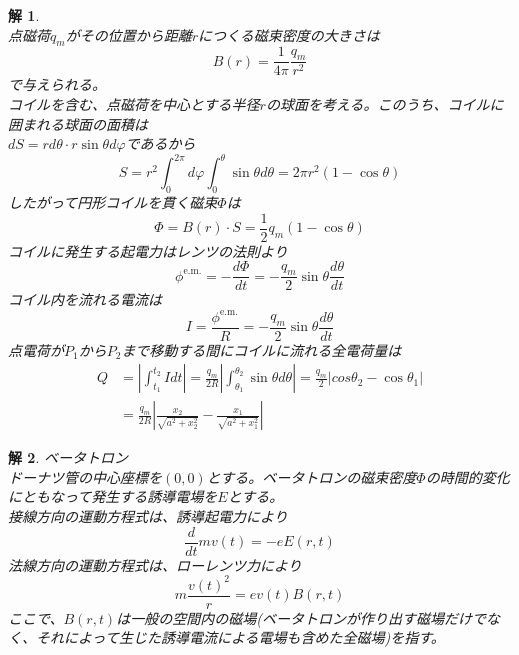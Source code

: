 \documentclass{jsarticle}
\newtheorem{ans}{解}[section]
\begin{document}
\begin{ans}~\\
    点磁荷\(q_{m}\)がその位置から距離\(r\)につくる磁束密度の大きさは
    \begin{equation*}
        B(r)=\frac{1}{4\pi}\frac{q_{m}}{r^2}
    \end{equation*}
    で与えられる。\\
    コイルを含む、点磁荷を中心とする半径\(r\)の球面を考える。このうち、コイルに囲まれる球面の面積は\\
    \(dS = rd\theta\cdot r\sin\theta d\varphi\)であるから
    \begin{equation*}
        S = r^{2}\int_{0}^{2\pi}d\varphi\int_{0}^{\theta}\sin\theta d\theta=2\pi r^{2}(1-\cos\theta)
    \end{equation*}
    したがって円形コイルを貫く磁束\(\Phi\)は
    \begin{equation*}
        \Phi = B(r)\cdot S=\frac{1}{2}q_{m}(1-\cos\theta)
    \end{equation*}
    コイルに発生する起電力はレンツの法則より
    \begin{equation*}
        \phi^{\mathrm{e.m.}}=-\frac{d\Phi}{dt}=-\frac{q_{m}}{2}\sin\theta\frac{d\theta}{dt}
    \end{equation*}
    コイル内を流れる電流は
    \begin{equation*}
        I = \frac{\phi^{\mathrm{e.m.}}}{R} = -\frac{q_{m}}{2}\sin\theta\frac{d\theta}{dt}
    \end{equation*}
    点電荷が\(P_{1}\)から\(P_{2}\)まで移動する間にコイルに流れる全電荷量は
    \begin{align*}
        Q&=\left|\int_{t_{1}}^{t_{2}}Idt\right|=\frac{q_{m}}{2R}\left|\int_{\theta_{1}}^{\theta_{2}}\sin\theta d\theta\right|
        =\frac{q_{m}}{2}\left|cos\theta_{2}-\cos\theta_{1}\right|\\
        &=\frac{q_{m}}{2R}\left|\frac{x_{2}}{\sqrt{a^{2}+x_{2}^{2}}}-\frac{x_{1}}{\sqrt{a^{2}+x_{1}^{2}}}\right|
    \end{align*}
\end{ans}

\begin{ans}ベータトロン\\
    ドーナツ管の中心座標を\((0,0)\)とする。ベータトロンの磁束密度\(\Phi\)の時間的変化にともなって発生する誘導電場を\(E\)とする。\\
    接線方向の運動方程式は、誘導起電力により
    \begin{equation*}
        \frac{d}{dt}mv(t) = -eE(r,t)
    \end{equation*}
    法線方向の運動方程式は、ローレンツ力により
    \begin{equation*}
        m\frac{v(t)^{2}}{r} = ev(t)B(r,t)
    \end{equation*}
    ここで、\(B(r,t)\)は一般の空間内の磁場(ベータトロンが作り出す磁場だけでなく、それによって生じた誘導電流による電場も含めた全磁場)を指す。
\end{ans}
\end{document}
